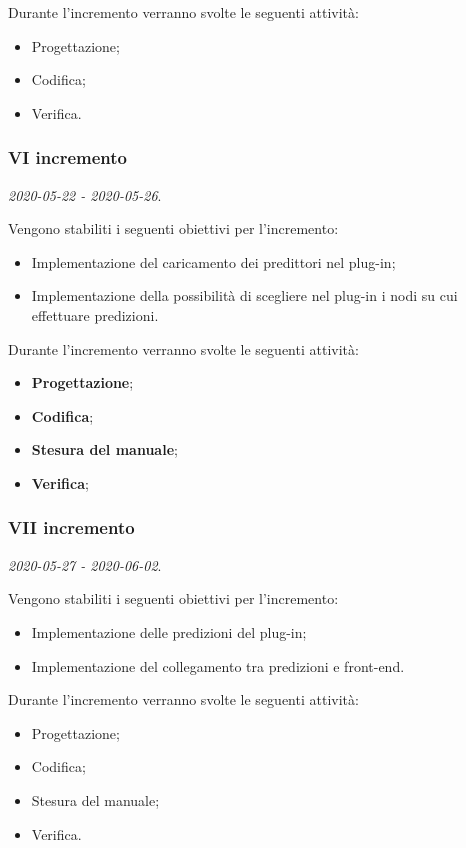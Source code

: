 \documentclass[../piano-di-progetto.tex]{subfiles}
\begin{document}
Durante l'incremento verranno svolte le seguenti attività: 
\begin{itemize}
    \item Progettazione;
    \item Codifica;
    \item Verifica.
\end{itemize}

\subsubsection{VI incremento}
\emph{2020-05-22 - 2020-05-26}. 
 
 Vengono stabiliti i seguenti obiettivi per l'incremento:
 \begin{itemize}
     \item Implementazione del caricamento dei predittori nel plug-in;
     \item Implementazione della possibilità di scegliere nel plug-in i nodi su cui effettuare predizioni.
 \end{itemize}

Durante l'incremento verranno svolte le seguenti attività: 
\begin{itemize}
    \item \textbf{Progettazione};
    \item \textbf{Codifica};
    \item \textbf{Stesura del manuale};
    \item \textbf{Verifica};
\end{itemize}

\subsubsection{VII incremento}
\emph{2020-05-27 - 2020-06-02}. 
 
 Vengono stabiliti i seguenti obiettivi per l'incremento:
 \begin{itemize}
    \item Implementazione delle predizioni del plug-in;
    \item Implementazione del collegamento tra predizioni e front-end.

\end{itemize}

Durante l'incremento verranno svolte le seguenti attività: 
\begin{itemize}
    \item Progettazione;
    \item Codifica;
    \item Stesura del manuale;
    \item Verifica.
\end{itemize}
\end{document}
